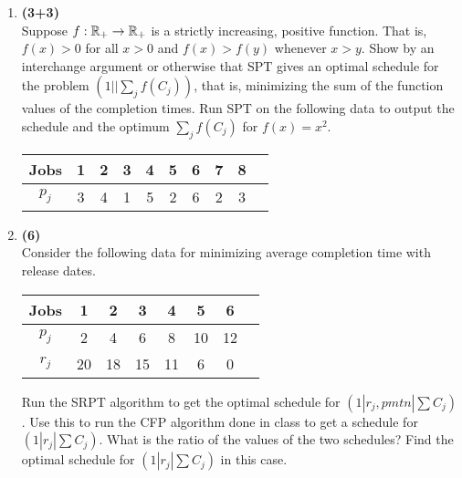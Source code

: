 \documentclass[10pt]{article}
\begin{document}
\MakeScribeTop
\begin{enumerate}
\item 
{\bf (3+3)}\\
Suppose $f:\mathbb R_+\to\mathbb R_+$ is a strictly increasing, positive function. That is, $f(x) > 0$ for all $x>0$ and $f(x) > f(y)$ whenever $x > y$.
Show by an interchange argument or otherwise that SPT gives an optimal schedule for the problem $(1||\sum_j f(C_j))$, that is, minimizing 
the sum of the function values of the completion times. Run SPT on the following data to output the schedule and the 
optimum $\sum_j f(C_j)$ for $f(x) = x^2$.
\begin{center}
\begin{tabular}{|c|c|c|c|c|c|c|c|c|c|}
\hline
Jobs &   1 & 2 & 3 & 4 & 5 & 6 & 7 & 8 \\ \hline
$p_j$ & 3 & 4 & 1 & 5 & 2 & 6 & 2 & 3\\
\hline
\end{tabular}
\end{center}


\item {\bf (6)}\\
Consider the following data for minimizing average completion time with release dates.
\begin{center}
\begin{tabular}{|c|c|c|c|c|c|c|c|}
\hline
Jobs   & 1 & 2 & 3 & 4 & 5 & 6\\ \hline
$p_j$ &  2 & 4 & 6 & 8 & 10 & 12 \\
$r_j$  & 20 & 18 & 15 & 11 & 6 & 0 \\
\hline
\end{tabular}
\end{center}
Run the SRPT algorithm to get the optimal schedule for $(1|r_j,pmtn|\sum C_j)$. Use this to run the 
CFP algorithm done in class to get a schedule for $(1|r_j|\sum C_j)$. What is the ratio of the values of the two schedules?
Find the optimal schedule for $(1|r_j|\sum C_j)$ in this case.


\end{enumerate}
\end{document}
